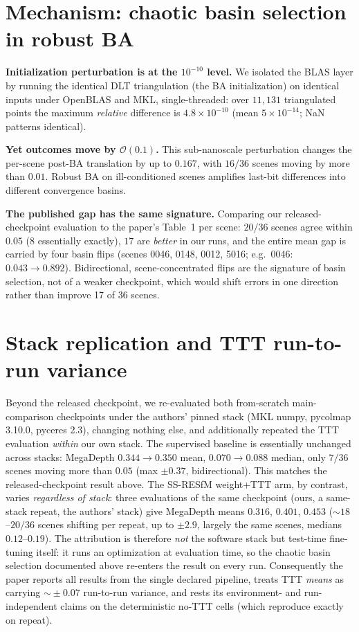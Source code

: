 \documentclass[10pt,twocolumn,letterpaper]{article}
\begin{document}
\section{Mechanism: chaotic basin selection in robust BA}\label{sec:mech}
\noindent\textbf{Initialization perturbation is at the $10^{-10}$ level.} We isolated the
BLAS layer by running the identical DLT triangulation (the BA initialization) on identical
inputs under OpenBLAS and MKL, single-threaded: over $11{,}131$ triangulated points the
maximum \emph{relative} difference is $4.8\times 10^{-10}$ (mean $5\times10^{-14}$; NaN
patterns identical).

\noindent\textbf{Yet outcomes move by $\mathcal{O}(0.1)$.} This sub-nanoscale perturbation
changes the per-scene post-BA translation by up to $0.167$, with $16/36$ scenes moving by
more than $0.01$. Robust BA on ill-conditioned scenes amplifies last-bit differences into
different convergence basins.

\noindent\textbf{The published gap has the same signature.} Comparing our released-checkpoint
evaluation to the paper's Table~1 per scene: $20/36$ scenes agree within $0.05$
($8$ essentially exactly), $17$ are \emph{better} in our runs, and the entire mean gap is carried by four
basin flips (scenes 0046, 0148, 0012, 5016; e.g.\ 0046: $0.043 \to 0.892$). Bidirectional,
scene-concentrated flips are the signature of basin selection, not of a weaker checkpoint,
which would shift errors in one direction rather than improve 17 of 36 scenes.

\section{Stack replication and TTT run-to-run variance}\label{sec:ttt}
Beyond the released checkpoint, we re-evaluated both from-scratch main-comparison
checkpoints under the authors' pinned stack (MKL numpy, pycolmap 3.10.0, pyceres 2.3),
changing nothing else, and additionally repeated the TTT evaluation \emph{within} our own
stack. The supervised baseline is essentially unchanged across stacks: MegaDepth
$0.344\!\to\!0.350$ mean, $0.070\!\to\!0.088$ median, only $7/36$ scenes moving more than
$0.05$ (max $\pm0.37$, bidirectional). This matches the released-checkpoint
result above. The SS-RESfM weight+TTT arm, by contrast, varies \emph{regardless of stack}:
three evaluations of the same checkpoint (ours, a same-stack repeat, the authors' stack)
give MegaDepth means $0.316$, $0.401$, $0.453$ ($\sim\!18$--$20/36$ scenes shifting per
repeat, up to $\pm2.9$, largely the same scenes, medians $0.12$--$0.19$). The
attribution is therefore \emph{not} the software stack but test-time fine-tuning itself:
it runs an optimization at evaluation time, so the chaotic basin selection documented
above re-enters the result on every run. Consequently the paper reports all results from
the single declared pipeline, treats TTT \emph{means} as carrying $\sim\!\pm0.07$
run-to-run variance, and rests its environment- and run-independent claims on the
deterministic no-TTT cells (which reproduce exactly on repeat).
\end{document}
